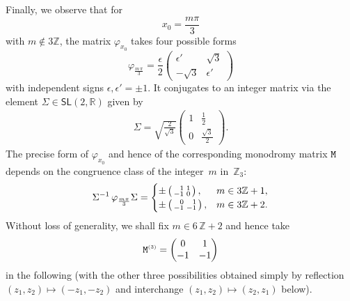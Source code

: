 \documentclass[pdftex]{sigma}
\numberwithin{equation}{section}
\newcommand{\Z}{\zed}
\newcommand{\sfSL}{\mathsf{SL}}
\newcommand{\zed}{{\mathbb Z}} %
\newcommand{\real}{{\mathbb R}} %
\begin{document}
Finally, we observe that for
\[
x_0 = \frac{m \pi}3
\]
with $m\notin 3 \Z$, the matrix $\varphi_{x_0}$ takes four possible forms
\[
\varphi^{\phantom{\dag}}_{\frac{m\,\pi}3} =
\frac\epsilon2\left(\begin{matrix} \epsilon' & \sqrt3 \\ -\sqrt3 &
 \epsilon' \end{matrix}\right)
\]
with independent signs $\epsilon,\epsilon'=\pm 1$. It
conjugates to an
integer matrix via the element $\Sigma\in\sfSL(2,\real)$ given by
\begin{gather}\label{eq:Sigmaell}
\Sigma = \sqrt{\tfrac2{\sqrt3}} \left(\begin{matrix} 1 & \frac12
 \\ 0 & \frac{\sqrt3}2 \end{matrix}\right) .
\end{gather}
The precise form of $\varphi^{\phantom{\dag}}_{x_0}$ and hence of the
corresponding monodromy matrix $\tt M$ depends on the congruence
class of the integer~$m$ in~$\Z_3$:
\[
\Sigma^{-1} \, \varphi^{\phantom{\dag}}_{\frac{m \pi}3}
\Sigma = \begin{cases}
\pm \left(\begin{smallmatrix} \hphantom{-}1 & 1 \\ -1 & 0\end{smallmatrix}\right) , & m\in 3 \Z+1 ,
\\
\pm \left(\begin{smallmatrix} \hphantom{-}0 & \hphantom{-}1 \\ -1 & -1\end{smallmatrix}\right), & m\in 3 \Z+2 .
\end{cases}
\]
Without loss of generality, we shall fix $m\in 6\,\Z+2$ and hence take
\begin{gather}\label{eq:mon3}
{\tt M}^{\text{\tiny(3)}} = \left( \begin{matrix}
0&1\\ -1&-1
\end{matrix}\right)
\end{gather}
in the following (with the other three possibilities obtained simply
by reflection $(z_1,z_2)\mapsto(-z_1,-z_2)$ and interchange
$(z_1,z_2)\mapsto(z_2,z_1)$ below).
\end{document}
